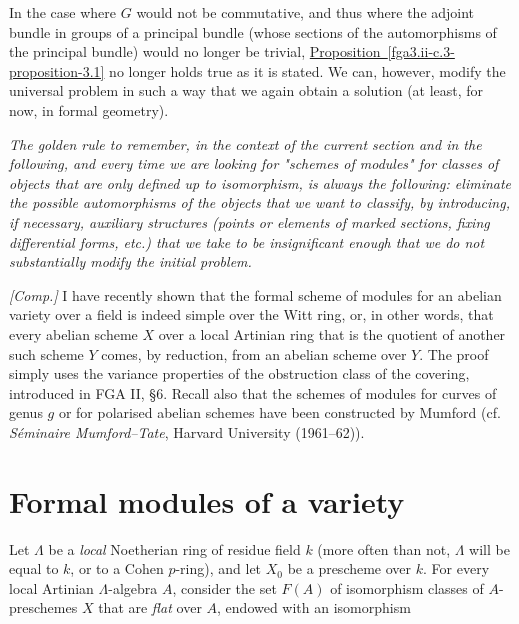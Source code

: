 \begin{remarks}{}
    In the case where \(G\) would not be commutative, and thus where the adjoint bundle in groups of a principal bundle (whose sections of the automorphisms of the principal bundle) would no longer be trivial, \hyperref[fga3.ii-c.3-proposition-3.1]{Proposition~\ref*{fga3.ii-c.3-proposition-3.1}} no longer holds true as it is stated.
    We can, however, modify the universal problem in such a way that we again obtain a solution (at least, for now, in formal geometry).
    
    \emph{The golden rule to remember, in the context of the current section and in the following, and every time we are looking for "schemes of modules" for classes of objects that are only defined up to isomorphism, is always the following: eliminate the possible automorphisms of the objects that we want to classify, by introducing, if necessary, auxiliary structures (points or elements of marked sections, fixing differential forms, etc.) that we take to be insignificant enough that we do not substantially modify the initial problem.}\end{remarks}\begin{remarks}{}\label{fga3.ii-c.3-remarks-ii}\skipsinglepar\par{}\emph{[Comp.]}
    I have recently shown that the formal scheme of modules for an abelian variety over a field is indeed simple over the Witt ring, or, in other words, that every abelian scheme \(X\) over a local Artinian ring that is the quotient of another such scheme \(Y\) comes, by reduction, from an abelian scheme over \(Y\).
    The proof simply uses the variance properties of the obstruction class of the covering, introduced in FGA II, §6.
    Recall also that the schemes of modules for curves of genus \(g\) or for polarised abelian schemes have been constructed by Mumford (cf. \emph{Séminaire Mumford–Tate}, Harvard University (1961–62)).\end{remarks}\section{Formal modules of a variety}\label{fga3.ii-c.4}\par{}Let \(\Lambda \) be a \emph{local} Noetherian ring of residue field \(k\) (more often than not, \(\Lambda \) will be equal to \(k\), or to a Cohen \(p\)-ring), and let \(X_0\) be a prescheme over \(k\).
  For every local Artinian \(\Lambda \)-algebra \(A\), consider the set \(F(A)\) of isomorphism classes of \(A\)-preschemes \(X\) that are \emph{flat} over \(A\), endowed with an isomorphism

